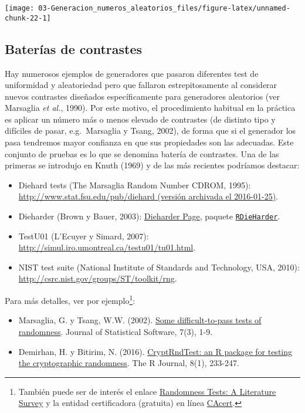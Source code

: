 \documentclass[
]{book}
\theoremstyle{break}
\theoremstyle{definition}
\theoremstyle{definition}
\theoremstyle{definition}
\theoremstyle{remark}
\begin{document}
\begin{center}\texttt{[image: 03-Generacion\_numeros\_aleatorios\_files/figure-latex/unnamed-chunk-22-1]} \end{center}

\hypertarget{baterias}{%
\subsection{Baterías de contrastes}\label{baterias}}

Hay numerosos ejemplos de generadores que pasaron diferentes test de uniformidad y aleatoriedad pero que fallaron estrepitosamente al considerar nuevos contrastes diseñados específicamente para generadores aleatorios (ver Marsaglia \emph{et al.}, 1990).
Por este motivo, el procedimiento habitual en la práctica es aplicar un número más o menos elevado de contrastes (de distinto tipo y difíciles de pasar, e.g.~Marsaglia y Tsang, 2002), de forma que si el generador los pasa tendremos mayor confianza en que sus propiedades son las adecuadas.
Este conjunto de pruebas es lo que se denomina batería de contrastes. Una de las primeras se introdujo en Knuth (1969) y de las más recientes podríamos destacar:

\begin{itemize}
\item
  Diehard tests (The Marsaglia Random Number CDROM, 1995):
  \href{https://web.archive.org/web/20160125103112/http://stat.fsu.edu/pub/diehard}{http://www.stat.fsu.edu/pub/diehard (versión archivada el 2016-01-25)}.
\item
  Dieharder (Brown y Bauer, 2003):
  \href{https://webhome.phy.duke.edu/~rgb/General/dieharder.php}{Dieharder Page},
  paquete \href{https://github.com/eddelbuettel/rdieharder}{\texttt{RDieHarder}}.
\item
  TestU01 (L'Ecuyer y Simard, 2007):
  \url{http://simul.iro.umontreal.ca/testu01/tu01.html}.
\item
  NIST test suite (National Institute of Standards and Technology, USA, 2010):
  \url{http://csrc.nist.gov/groups/ST/toolkit/rng}.
\end{itemize}

Para más detalles, ver por ejemplo\footnote{También puede ser de interés el enlace \href{http://www.ciphersbyritter.com/RES/RANDTEST.HTM}{Randomness Tests: A Literature Survey} y la entidad certificadora (gratuita) en línea \href{http://www.cacert.at/random}{CAcert}.}:

\begin{itemize}
\item
  Marsaglia, G. y Tsang, W.W. (2002). \href{http://www.jstatsoft.org/v07/i03}{Some difficult-to-pass tests of randomness}. Journal of Statistical Software, 7(3), 1-9.
\item
  Demirhan, H. y Bitirim, N. (2016). \href{https://journal.r-project.org/archive/2016/RJ-2016-016/index.html}{CryptRndTest: an R package for testing the cryptographic randomness}.
  The R Journal, 8(1), 233-247.
\end{itemize}
\end{document}
